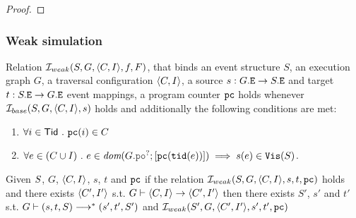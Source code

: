 \documentclass[12pt]{article}
\begin{document}
\begin{proof}






    
\end{proof}

\subsubsection{Weak simulation}

\begin{definition}
  Relation $\mathcal{I}_{weak}(S, G, \langle C, I \rangle, f, F)$, that binds an 
  event structure $S$, an \imm execution graph $G$,
  a traversal configuration $\langle C, I \rangle$,
  a source $s : G.{\mathtt{E}} \rightarrow S.{\mathtt{E}}$ and target $t : S.{\mathtt{E}} \rightarrow G.{\mathtt{E}}$ event mappings,
  a program counter ${\mathtt{pc}}$
  holds whenever $\mathcal{I}_{base}(S, G, \langle C, I \rangle, s)$ holds and
  additionally the following conditions are met:
  \begin{enumerate}[label=\textbf{S.\arabic*},start=6]

    \item \label{item:sim-pc}
      $\forall{i \in \mathsf{Tid}} ~.~ {\mathtt{pc}}(i) \in C$

     
    \item \label{item:sim-vis-weak}
      $\forall{e \in (C \cup I)} ~.~
      e \in \dom{G.\lPO^?;[\lPC(\lTID(e))]} \implies s(e) \in \lVIS(S)$.

  \end{enumerate}
\end{definition}

\begin{lemma}
  Given $S$, $G$, $\langle C, I \rangle$, $s$, $t$ and ${\mathtt{pc}}$
  if the relation $\mathcal{I}_{weak}(S, G, \langle C, I \rangle, s, t, {\mathtt{pc}})$ holds and 
  there exists $\langle C', I' \rangle$
  s.t. $G \vdash \langle C, I \rangle \rightarrow \langle C', I' \rangle$
  then there exists $S'$, $s'$ and $t'$ s.t. $G \vdash (s, t, S) \longrightarrow^* (s', t', S')$
  and $\mathcal{I}_{weak}(S', G, \langle C', I' \rangle, s', t', {\mathtt{pc}})$ 
\end{lemma}
\end{document}
